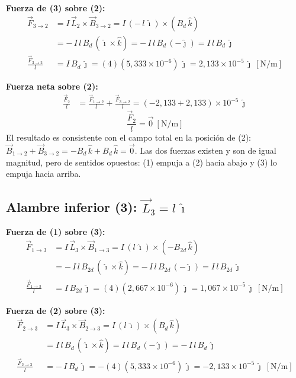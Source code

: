 \documentclass[12pt,letterpaper]{article}
\begin{document}
\noindent\textbf{Fuerza de (3) sobre (2):}
\begin{align*}
    \vec{F}_{3\to2} &= I\,\vec{L}_2\times\vec{B}_{3\to2}
                     = I\,(-\,l\,\hat{\imath})\times(B_d\,\hat{k})\\[3pt]
                    &= -\,I\,l\,B_d\,(\hat{\imath}\times\hat{k})
                     = -\,I\,l\,B_d\,(-\hat{\jmath})
                     = I\,l\,B_d\,\hat{\jmath}\\[3pt]
    \frac{\vec{F}_{3\to2}}{l} &= I\,B_d\,\hat{\jmath}
                     = (4)(5{,}333\times10^{-6})\,\hat{\jmath}
                     = 2{,}133\times10^{-5}\,\hat{\jmath}\ [\text{N/m}]
\end{align*}

\noindent\textbf{Fuerza neta sobre (2):}
\begin{align*}
    \frac{\vec{F}_2}{l} &= \frac{\vec{F}_{1\to2}}{l} + \frac{\vec{F}_{3\to2}}{l}
                         = (-2{,}133 + 2{,}133)\times10^{-5}\,\hat{\jmath}
\end{align*}
\[
    \boxed{\frac{\vec{F}_2}{l} = \vec{0}\ [\text{N/m}]}
\]
\noindent El resultado es consistente con el campo total en la posici\'on de (2):
$\vec{B}_{1\to2}+\vec{B}_{3\to2} = -B_d\,\hat{k} + B_d\,\hat{k} = \vec{0}$. Las dos fuerzas existen
y son de igual magnitud, pero de sentidos opuestos: (1) empuja a (2) hacia abajo y (3) lo empuja
hacia arriba.

\subsection*{Alambre inferior (3):\; $\vec{L}_3 = l\,\hat{\imath}$}

\noindent\textbf{Fuerza de (1) sobre (3):}
\begin{align*}
    \vec{F}_{1\to3} &= I\,\vec{L}_3\times\vec{B}_{1\to3}
                     = I\,(l\,\hat{\imath})\times(-B_{2d}\,\hat{k})\\[3pt]
                    &= -\,I\,l\,B_{2d}\,(\hat{\imath}\times\hat{k})
                     = -\,I\,l\,B_{2d}\,(-\hat{\jmath})
                     = I\,l\,B_{2d}\,\hat{\jmath}\\[3pt]
    \frac{\vec{F}_{1\to3}}{l} &= I\,B_{2d}\,\hat{\jmath}
                     = (4)(2{,}667\times10^{-6})\,\hat{\jmath}
                     = 1{,}067\times10^{-5}\,\hat{\jmath}\ [\text{N/m}]
\end{align*}

\noindent\textbf{Fuerza de (2) sobre (3):}
\begin{align*}
    \vec{F}_{2\to3} &= I\,\vec{L}_3\times\vec{B}_{2\to3}
                     = I\,(l\,\hat{\imath})\times(B_d\,\hat{k})\\[3pt]
                    &= I\,l\,B_d\,(\hat{\imath}\times\hat{k})
                     = I\,l\,B_d\,(-\hat{\jmath})
                     = -\,I\,l\,B_d\,\hat{\jmath}\\[3pt]
    \frac{\vec{F}_{2\to3}}{l} &= -\,I\,B_d\,\hat{\jmath}
                     = -(4)(5{,}333\times10^{-6})\,\hat{\jmath}
                     = -2{,}133\times10^{-5}\,\hat{\jmath}\ [\text{N/m}]
\end{align*}
\end{document}
